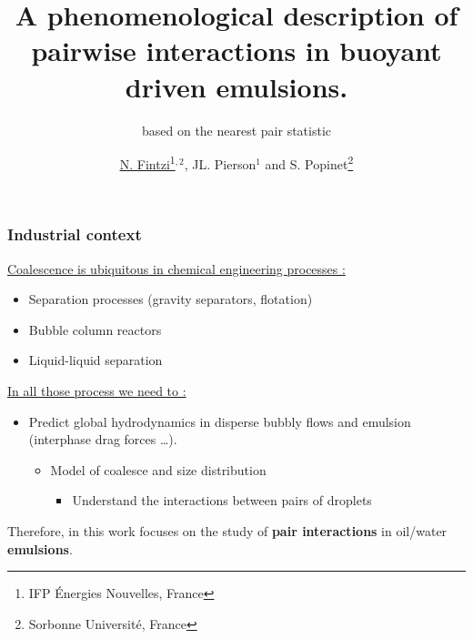 \documentclass{sintefbeamer}
\title{A phenomenological description of pairwise interactions in buoyant driven emulsions.}
\subtitle{based on the nearest pair statistic}
\author{\href{http://basilisk.fr/sandbox/fintzin/Rising-Suspenion/RS.c}{\underline{N. Fintzi}\footnote{IFP \'Energies Nouvelles, France}$^{,2}$}, JL. Pierson$^1$ and S. Popinet\footnote{Sorbonne Universit\'e, France}}
\begin{document}

\begin{frame}
  \frametitle{Industrial context}
  \underline{Coalescence is ubiquitous in chemical engineering processes :}
  \begin{itemize}
    \item Separation processes (gravity separators, flotation)
    \item Bubble column reactors
    \item Liquid-liquid separation
  \end{itemize}
  \vfill
  \underline{In all those process we need to : }
  \begin{itemize}
    \item Predict global hydrodynamics in disperse bubbly flows and emulsion (interphase drag forces \ldots).
    \begin{itemize}
      \item Model of coalesce and size distribution 
      \begin{itemize}
        \item Understand the interactions between pairs of droplets
      \end{itemize}
    \end{itemize}
  \end{itemize}

  \vfill
  Therefore, in this work focuses on the study of \textbf{pair interactions} in oil/water \textbf{emulsions}.
\end{frame}
\end{document}
